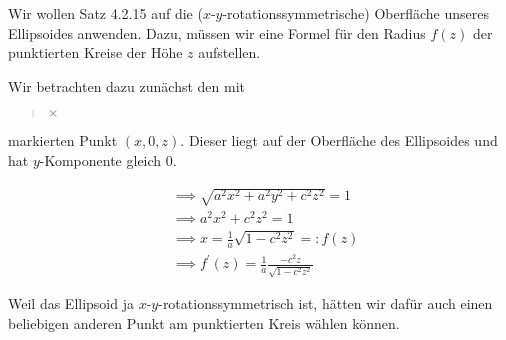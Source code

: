 \begin{solution}

\phantom{}

\begin{center}
\end{center}


Wir wollen Satz 4.2.15 auf die ($x$-$y$-rotationssymmetrische) Oberfläche unseres Ellipsoides anwenden.
Dazu, müssen wir eine Formel für den Radius $f(z)$ der punktierten Kreise der Höhe $z$ aufstellen.

Wir betrachten dazu zunächst den mit \blockquote{$\times$} markierten Punkt $(x, 0, z)$.
Dieser liegt auf der Oberfläche des Ellipsoides und hat $y$-Komponente gleich $0$.

\begin{align*}
    & \implies
    \sqrt{a^2 x^2 + a^2 y^2 + c^2 z^2} = 1 \\
    & \implies
    a^2 x^2 + c^2 z^2 = 1 \\
    & \implies
    x = \frac{1}{a} \sqrt{1 - c^2 z^2} =: f(z) \\
    & \implies
    f^\prime(z) = \frac{1}{a} \frac{-c^2 z}{\sqrt{1 - c^2 z^2}}
\end{align*}

Weil das Ellipsoid ja $x$-$y$-rotationssymmetrisch ist, hätten wir dafür auch einen beliebigen anderen Punkt am punktierten Kreis wählen können.


\end{solution}
